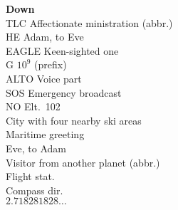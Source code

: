 \documentclass[12pt]{article}
\begin{document}
\begin{PuzzleClues}{\textbf{Down}}\bigskip \\
   {TLC}   {Affectionate ministration (abbr.)} \\
   {HE}    {Adam, to Eve} \\
   {EAGLE} {Keen-sighted one} \\
   {G}     {$10^9$ (prefix)} \\
   {ALTO}  {Voice part} \\
   {SOS}   {Emergency broadcast} \\
   {NO}    {Elt.\ 102} \\
   {City with four nearby ski areas} \\
    {Maritime greeting} \\
     {Eve, to Adam} \\
      {Visitor from another planet (abbr.)} \\
     {Flight stat.} \\
      {Compass dir.} \\
       {$2.718281828\dots$}
\end{PuzzleClues}
\end{document}
